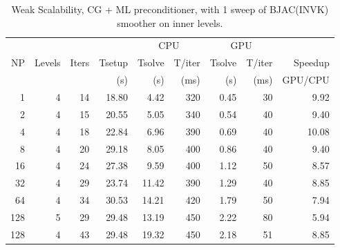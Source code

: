 \begin{table}[h!]
\centering
\begin{tabular}{rrrrrrrrr}
    &        &       &        & \multicolumn{2}{c}{CPU} & \multicolumn{2}{c}{GPU} & \\
NP  & Levels & Iters & Tsetup & Tsolve & T/iter  & Tsolve & T/iter  & Speedup\\
    &        &       & (s)    & (s)    & (ms)    & (s)    & (ms)    & GPU/CPU \\
\hline
1   & 4       & 14  & 18.80 & 4.42  & 320    & 0.45 & 30   &  9.92  \\
2   & 4       & 15  & 20.55 & 5.05  & 340    & 0.54 & 40   &  9.40  \\
4   & 4       & 18  & 22.84 & 6.96  & 390    & 0.69 & 40   &  10.08 \\
8   & 4       & 20  & 29.18 & 8.05  & 400    & 0.86 & 40   &  9.40  \\
16  & 4       & 24  & 27.38 & 9.59  & 400    & 1.12 & 50   &  8.57  \\
32  & 4       & 29  & 23.74 & 11.42 & 390    & 1.29 & 40   &  8.85  \\
64  & 4       & 34  & 30.53 & 14.21 & 420    & 1.79 & 50   &  7.94  \\
128 & 5       & 29  & 29.48 & 13.19 & 450    & 2.22 & 80   &  5.94  \\
\hline
128 & 4       & 43  & 29.48 & 19.32 & 450    & 2.18 & 51   &  8.85  \\
\hline
\end{tabular}
\caption{Weak Scalability,  CG + ML preconditioner,  with 1 sweep of BJAC(INVK) smoother on inner levels.\label{gpu-invk}}
\end{table}


